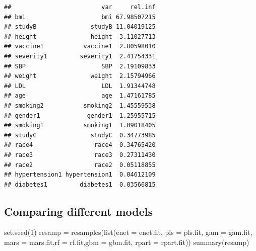 \documentclass[
]{article}
\newenvironment{Shaded}{\begin{snugshade}}{\end{snugshade}}
\newcommand{\AttributeTok}[1]{\textcolor[rgb]{0.77,0.63,0.00}{#1}}
\newcommand{\DecValTok}[1]{\textcolor[rgb]{0.00,0.00,0.81}{#1}}
\newcommand{\FunctionTok}[1]{\textcolor[rgb]{0.00,0.00,0.00}{#1}}
\newcommand{\NormalTok}[1]{#1}
\newcommand{\OtherTok}[1]{\textcolor[rgb]{0.56,0.35,0.01}{#1}}
\begin{document}
\begin{verbatim}
##                         var     rel.inf
## bmi                     bmi 67.98507215
## studyB               studyB 11.04019125
## height               height  3.11027713
## vaccine1           vaccine1  2.80598010
## severity1         severity1  2.41754331
## SBP                     SBP  2.19109833
## weight               weight  2.15794966
## LDL                     LDL  1.91344748
## age                     age  1.47161785
## smoking2           smoking2  1.45559538
## gender1             gender1  1.25955715
## smoking1           smoking1  1.09018405
## studyC               studyC  0.34773985
## race4                 race4  0.34765420
## race3                 race3  0.27311430
## race2                 race2  0.05118855
## hypertension1 hypertension1  0.04612109
## diabetes1         diabetes1  0.03566815
\end{verbatim}

\hypertarget{comparing-different-models}{%
\subsection{Comparing different
models}\label{comparing-different-models}}

\begin{Shaded}
\begin{Highlighting}[]
\FunctionTok{set.seed}\NormalTok{(}\DecValTok{1}\NormalTok{)}
\NormalTok{resamp }\OtherTok{=} \FunctionTok{resamples}\NormalTok{(}\FunctionTok{list}\NormalTok{(}\AttributeTok{enet =}\NormalTok{ enet.fit, }\AttributeTok{pls =}\NormalTok{ pls.fit, }\AttributeTok{gam =}\NormalTok{ gam.fit, }\AttributeTok{mars =}\NormalTok{ mars.fit,}\AttributeTok{rf =}\NormalTok{ rf.fit,}\AttributeTok{gbm =}\NormalTok{ gbm.fit, }\AttributeTok{rpart =}\NormalTok{ rpart.fit))}
\FunctionTok{summary}\NormalTok{(resamp)}
\end{Highlighting}
\end{Shaded}
\end{document}
